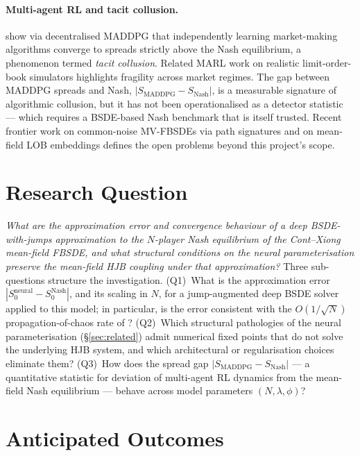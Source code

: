 \documentclass[11pt,a4paper]{article}
\begin{document}
\paragraph{Multi-agent RL and tacit collusion.}
\citet{cont2024} show via decentralised MADDPG that independently
learning market-making algorithms converge to spreads strictly above
the Nash equilibrium, a phenomenon termed \emph{tacit collusion}.
Related MARL work on realistic limit-order-book simulators
\citep{karpe2020, shi2024, cheridito2025} highlights fragility across
market regimes.  The gap between MADDPG spreads and Nash,
$|S_{\mathrm{MADDPG}} - S_{\mathrm{Nash}}|$, is a measurable
signature of algorithmic collusion, but it has not been operationalised
as a detector statistic --- which requires a BSDE-based Nash benchmark
that is itself trusted.  Recent frontier work on common-noise
MV-FBSDEs via path signatures \citep{hu2025} and on mean-field LOB
embeddings \citep{navarro2025} defines the open problems beyond this
project's scope.


\section{Research Question}\label{sec:question}

\emph{What are the approximation error and convergence
behaviour of a deep BSDE-with-jumps approximation to the
$N$-player Nash equilibrium of the Cont--Xiong mean-field FBSDE,
and what structural conditions on the neural parameterisation
preserve the mean-field HJB coupling under that approximation?}
Three sub-questions structure the investigation.  (Q1)~What is
the approximation error $|S^{\text{neural}}_0 - S^{\text{Nash}}_0|$,
and its scaling in $N$, for a jump-augmented deep BSDE solver
applied to this model; in particular, is the error consistent
with the $O(1/\sqrt{N})$ propagation-of-chaos rate of
\citet{buckdahn2009limit}?  (Q2)~Which structural pathologies of
the neural parameterisation (\S\ref{sec:related}) admit numerical
fixed points that do not solve the underlying HJB system, and
which architectural or regularisation choices eliminate them?
(Q3)~How does the spread gap
$|S_{\mathrm{MADDPG}} - S_{\mathrm{Nash}}|$ --- a quantitative
statistic for deviation of multi-agent RL dynamics from the
mean-field Nash equilibrium --- behave across model parameters
$(N, \lambda, \phi)$?


\section{Anticipated Outcomes}\label{sec:outcomes}
\end{document}
